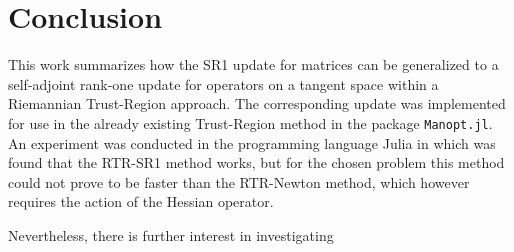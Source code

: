 \chapter{Conclusion}

This work summarizes how the SR1 update for matrices can be generalized to a self-adjoint rank-one update for operators on a tangent space within a Riemannian Trust-Region approach. The corresponding update was implemented for use in the already existing Trust-Region method in the package \lstinline!Manopt.jl!. An experiment was conducted in the programming language Julia in which was found that the RTR-SR1 method works, but for the chosen problem this method could not prove to be faster than the RTR-Newton method, which however requires the action of the Hessian operator. 

Nevertheless, there is further interest in investigating 